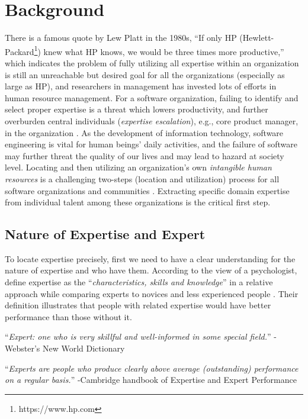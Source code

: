 \chapter{Background}

There is a famous quote by Lew Platt in the 1980s, ``If only HP (Hewlett-Packard\footnote{https://www.hp.com}) knew what HP  knows, we would be three times more productive,'' which indicates the problem of fully utilizing all expertise within an organization is still an unreachable but desired goal for all the organizations (especially as large as HP), and researchers in management \cite{HPKnows1999} has invested lots of efforts in human resource management. For a software organization, failing to identify and select proper expertise is a threat which lowers productivity, and further overburden central individuals (\textit{expertise escalation}), e.g., core product manager, in the organization \cite{mcdonald1998just}. As the development of information technology, software engineering is vital for human beings' daily activities, and the failure of software may further threat the quality of our lives and may lead to hazard at society level. Locating and then utilizing an organization's own \textit{intangible human resources} is a challenging two-steps (location and utilization) process for all software organizations and communities \cite{bohlander2010managing}. Extracting specific domain expertise from individual talent among these organizations is the critical first step.

\section{Nature of Expertise and Expert}

To locate expertise precisely, first we need to have a clear understanding for the nature of expertise and who have them. According to the view of a psychologist, \citeauthor{ericsson2006cambridge} define expertise as the ``\textit{characteristics, skills and knowledge}'' in a relative approach while comparing experts to novices and less experienced people \cite{ericsson2006cambridge}. Their definition illustrates that people with related expertise would have better performance than those without it.

\begin{displayquote}
``\textit{Expert: one who is very skillful and well-informed in some special field.}'' -Webster's New World Dictionary

``\textit{Experts are people who produce clearly above average (outstanding) performance on a regular basis.}'' -Cambridge handbook of Expertise and Expert Performance
\end{displayquote}

